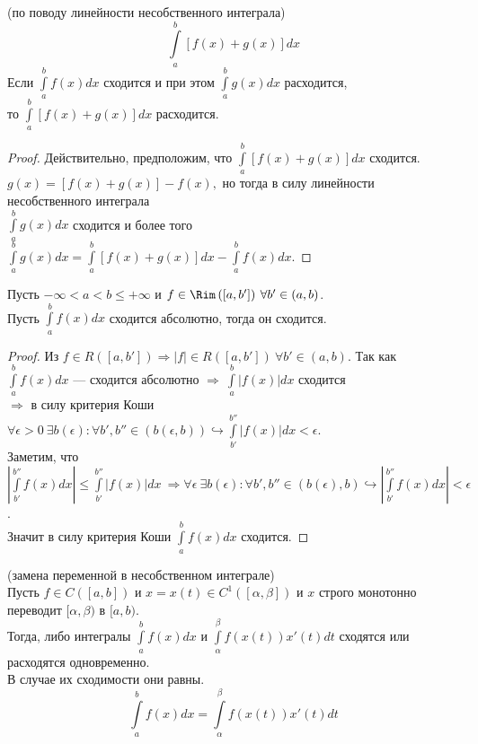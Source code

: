 \begin{remark}
    (по поводу линейности несобственного интеграла)
    $$\int \limits_a^b \left[ f(x) + g(x)\right] dx$$
    Если $\int \limits_a^b f(x) dx$ сходится и при этом $\int \limits_a^b g(x) dx$ расходится, \\ то $\int \limits_a^b \left[ f(x) + g(x)\right] dx$ расходится.
\end{remark}

\begin{proof}
    Действительно, предположим, что $\int \limits_a^b \left[ f(x) + g(x)\right] dx$ сходится. \\
    $ g(x) = \left[ f(x) + g(x) \right] - f(x),$
    но тогда в силу линейности несобственного интеграла \\ $\int \limits_a^b g(x) dx$ сходится и более того $\int \limits_a^b g(x) dx = \int \limits_a^b \left[ f(x) + g(x)\right] dx - \int \limits_a^b f(x) dx.$
\end{proof}

\begin{theorem}
    Пусть $ -\infty < a < b \leq + \infty$ и $f \in \Rim\left( [a, b']\right) \: \forall b' \in (a, b)$. \\
    Пусть $\int \limits_a^b f(x) dx$ сходится абсолютно, тогда он сходится.
\end{theorem}

\begin{proof}
    Из $f \in R\left( [a, b']\right) \Longrightarrow |f| \in R([a, b']) \ \forall b' \in (a, b).$ 
    Так как $\int \limits_a^b f(x) dx$ — сходится абсолютно $\Longrightarrow \ \int \limits_a^b |f(x)| dx$ сходится \\
    $\Longrightarrow $ в силу критерия Коши $\forall \epsilon > 0 \ \exists b(\epsilon): \forall b', b'' \in (b(\epsilon, b)) \hookrightarrow \int \limits_{b'}^{b''} |f(x)| dx < \epsilon.$ \\
    Заметим, что $\left| \int \limits_{b'}^{b''} f(x) dx \right| \leq \int \limits_{b'}^{b''} |f(x)| dx \ \Longrightarrow \forall \epsilon \ \exists b(\epsilon) : \forall b', b'' \in (b(\epsilon), b) \hookrightarrow \left| \int \limits_{b'}^{b''} f(x) dx \right| < \epsilon$. \\
    Значит в силу критерия Коши $\int \limits_a^b f(x) dx$ сходится.
\end{proof}

\begin{theorem} (замена переменной в несобственном интеграле) \\
    Пусть $f \in C\left([a, b]\right)$ и $x = x(t) \in C^1\left([\alpha, \beta]\right)$ и $x$ строго монотонно переводит $[\alpha, \beta)$ в $[a, b)$. \\
    Тогда, либо интегралы $\int \limits_a^b f(x)dx$ и $\int \limits_{\alpha}^{\beta} f(x(t))x'(t)dt$ сходятся или расходятся одновременно.\\
    В случае их сходимости они равны. $$\int \limits_a^b f(x)dx = \int \limits_{\alpha}^{\beta} f(x(t))x'(t)dt$$
\end{theorem}

